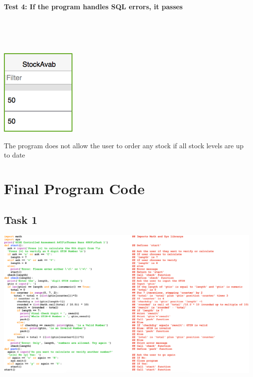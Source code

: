 \documentclass[a4paper]{article}
\begin{document}
\paragraph{Test 4: If the program handles SQL errors, it passes} ~\par ~\par
\noindent\includegraphics{testing_24.png} \par
The program does not allow the user to order any stock if all stock levels are up to date
\newpage


\section{Final Program Code}
\subsection{Task 1}
\noindent\includegraphics[width=1\textwidth, left]{task1FINALCODE.png} \par 
\newpage
\end{document}
